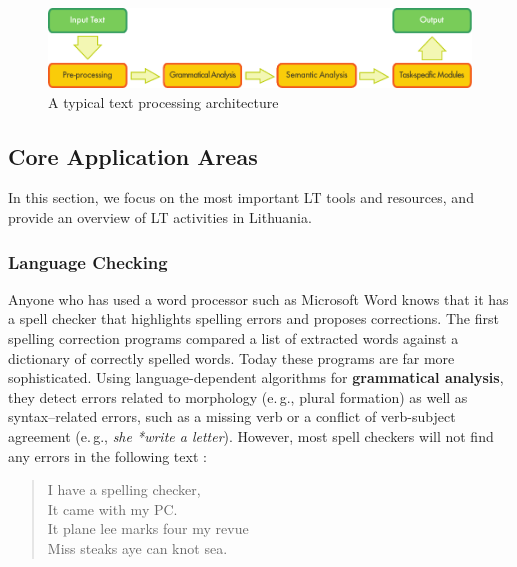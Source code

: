 \begin{multicols}{2}
\begin{figure}[htb]
  \center
  \includegraphics[width=\textwidth]{../_media/english/text_processing_app_architecture}
  \caption{A typical text processing architecture}
  \label{fig:textprocessingarch_en}
\end{figure}

\subsection{Core Application Areas}

In this section, we focus on the most important LT tools and resources, and provide an overview of LT activities in Lithuania. 

\subsubsection{Language Checking}

Anyone who has used a word processor such as Microsoft Word knows that it has a spell checker that highlights spelling errors and proposes corrections. The first spelling correction programs compared a list of extracted words against a dictionary of correctly spelled words. Today these programs are far more sophisticated. Using language-dependent algorithms for \textbf{grammatical analysis}, they detect errors related to morphology (e.\,g., plural formation) as well as syntax–related errors, such as a missing verb or a conflict of verb-subject agreement (e.\,g., \textit{she *write a letter}). However, most spell checkers will not find any errors in the following text \cite{zar1}:

\begin{quote}
  I have a spelling checker,\\
  It came with my PC.\\
  It plane lee marks four my revue\\
  Miss steaks aye can knot sea.
\end{quote}



\end{multicols}
